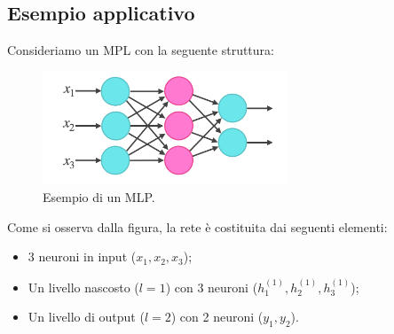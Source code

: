 \newpage
\subsection{Esempio applicativo}
Consideriamo un MPL con la seguente struttura:
\begin{figure}[H]
    \centering
    \includegraphics[width=0.65\textwidth]{Immagini/Generiche/esempioAplicativo_MPL.png}
    \caption{Esempio di un MLP.}
    
\end{figure}

Come si osserva dalla figura, la rete è costituita dai seguenti elementi:

\begin{itemize}
    \item 3 neuroni in input (\(x_1, x_2, x_3\));
    \item Un livello nascosto (\(l=1\)) con 3 neuroni (\(h_1^{(1)}, h_2^{(1)}, h_3^{(1)}\));
    \item Un livello di output (\(l=2\)) con 2 neuroni (\({y}_1, {y}_2\)).
\end{itemize}

